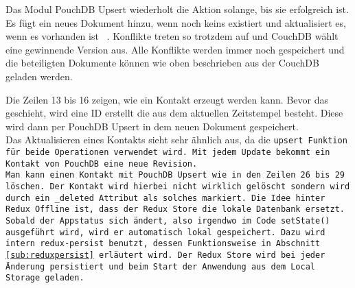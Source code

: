 Das Modul PouchDB Upsert wiederholt die Aktion solange, bis sie erfolgreich ist.
Es fügt ein neues Dokument hinzu, wenn noch keins existiert und aktualisiert es, wenn es vorhanden ist ~\cite{pouch_conflicts}.
Konflikte treten so trotzdem auf und CouchDB wählt eine gewinnende Version aus.
Alle Konflikte werden immer noch gespeichert und die beteiligten Dokumente können wie oben beschrieben aus der CouchDB geladen werden.
%
\begin{center}
  
\end{center}
%
Die Zeilen 13 bis 16 zeigen, wie ein Kontakt erzeugt werden kann. Bevor das geschieht, wird eine ID erstellt die aus dem aktuellen Zeitstempel besteht.
Diese wird dann per PouchDB Upsert in dem neuen Dokument gespeichert.\\
Das Aktualisieren eines Kontakts sieht sehr ähnlich aus, da die \tt{upsert} Funktion für beide Operationen verwendet wird.
Mit jedem Update bekommt ein Kontakt von PouchDB eine neue Revision.\\
Man kann einen Kontakt mit PouchDB Upsert wie in den Zeilen 26 bis 29 löschen.
Der Kontakt wird hierbei nicht wirklich gelöscht sondern wird durch ein \tt{\_deleted} Attribut als solches markiert.
%
%
Die Idee hinter Redux Offline ist, dass der Redux Store die lokale Datenbank ersetzt.
Sobald der \gls{App}status sich ändert, also irgendwo im Code \tt{setState()} ausgeführt wird, wird er automatisch lokal gespeichert.
Dazu wird intern \tt{redux-persist} benutzt, dessen Funktionsweise in Abschnitt \ref{sub:reduxpersist} erläutert wird.
Der Redux Store wird bei jeder Änderung persistiert und beim Start der Anwendung aus dem Local Storage geladen.
